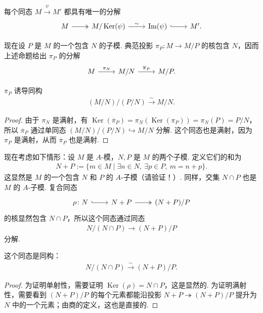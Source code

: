 \begin{corollary*}
每个同态 $M\xrightarrow{\psi}M'$ 都具有唯一的分解
\[
\begin{tikzcd}
 M\arrow[r,two heads] & M/\operatorname{Ker}(\psi)\arrow[r,"\sim"] & \operatorname{Im}(\psi)\arrow[r,hook] & M'.
\end{tikzcd}
\]
\end{corollary*}
现在设 $P$ 是 $M$ 的一个包含 $N$ 的子模. 典范投影 $\pi_P\colon M\longrightarrow M/P$ 的核包含 $N$，因而上述命题给出 $\pi_P$ 的分解
\[
\begin{tikzcd}
 M\arrow[r,"\pi_N"] & M/N\arrow[r,"\overline\pi_P"] & M/P.
\end{tikzcd}
\]
\begin{corollary*}[{第一同构定理}]
$\overline\pi_P$ 诱导同构
\begin{align*}
 (M/N)/(P/N)\xrightarrow{\sim}M/N.
\end{align*}
\footnotemark
\end{corollary*}
\begin{proof}
由于 $\pi_N$ 是满射，有 $\operatorname{Ker}(\overline\pi_P)=\pi_N(\operatorname{Ker}(\pi_P))=\pi_N(P)=P/N$，所以 $\overline\pi_P$ 通过单同态 $(M/N)/(P/N)\hookrightarrow M/N$ 分解. 这个同态也是满射，因为 $\pi_P$ 是满射，从而 $\overline\pi_P$ 也是满射.
\end{proof}
现在考虑如下情形：设 $M$ 是 $A$-模，$N,P$ 是 $M$ 的两个子模. 定义它们的和为
\begin{align*}
 N+P:=\{m\in M\mid\exists n\in N,\ \exists p\in P,\ m=n+p\}.
\end{align*}
这显然是 $M$ 的一个包含 $N$ 和 $P$ 的 $A$-子模（请验证！）. 同样，交集 $N\cap P$ 也是 $M$ 的 $A$-子模. 复合同态
\[
\begin{tikzcd}
 \rho\colon N\arrow[r,hook] & N+P\arrow[r,two heads] & (N+P)/P
\end{tikzcd}
\]
的核显然包含 $N\cap P$，所以这个同态通过同态
\begin{align*}
 N/(N\cap P)\longrightarrow(N+P)/P
\end{align*}
分解.
\begin{proposition*}[{第二同构定理}]
这个同态是同构：
\begin{align*}
 N/(N\cap P)\xrightarrow{\sim}(N+P)/P.
\end{align*}
\end{proposition*}
\begin{proof}
为证明单射性，需要证明 $\operatorname{Ker}(\rho)=N\cap P$，这是显然的. 为证明满射性，需要看到 $(N+P)/P$ 的每个元素都能沿投影 $N+P\twoheadrightarrow(N+P)/P$ 提升为 $N$ 中的一个元素；由商的定义，这也是直接的.
\end{proof}

